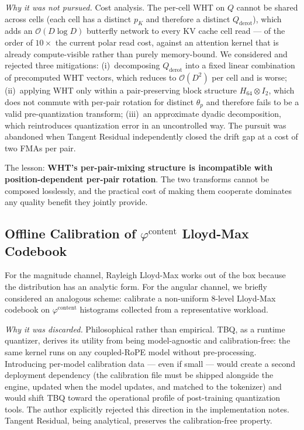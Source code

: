 \documentclass[10pt,twocolumn]{article}
\begin{document}
\emph{Why it was not pursued.} Cost analysis. The per-cell WHT on $Q$ cannot be shared across cells (each cell has a distinct $p_K$ and therefore a distinct $Q_{\text{derot}}$), which adds an $\mathcal{O}(D\log D)$ butterfly network to every KV cache cell read --- of the order of $10\times$ the current polar read cost, against an attention kernel that is already compute-visible rather than purely memory-bound. We considered and rejected three mitigations: (i)~decomposing $Q_{\text{derot}}$ into a fixed linear combination of precomputed WHT vectors, which reduces to $\mathcal{O}(D^2)$ per cell and is worse; (ii)~applying WHT only within a pair-preserving block structure $H_{64}\otimes I_2$, which does not commute with per-pair rotation for distinct $\theta_p$ and therefore fails to be a valid pre-quantization transform; (iii)~an approximate dyadic decomposition, which reintroduces quantization error in an uncontrolled way. The pursuit was abandoned when Tangent Residual independently closed the drift gap at a cost of two FMAs per pair.

The lesson: \textbf{WHT's per-pair-mixing structure is incompatible with position-dependent per-pair rotation}. The two transforms cannot be composed losslessly, and the practical cost of making them cooperate dominates any quality benefit they jointly provide.

\subsection{Offline Calibration of $\varphi^{\text{content}}$ Lloyd-Max Codebook}

For the magnitude channel, Rayleigh Lloyd-Max works out of the box because the distribution has an analytic form. For the angular channel, we briefly considered an analogous scheme: calibrate a non-uniform 8-level Lloyd-Max codebook on $\varphi^{\text{content}}$ histograms collected from a representative workload.

\emph{Why it was discarded.} Philosophical rather than empirical. TBQ, as a runtime quantizer, derives its utility from being model-agnostic and calibration-free: the same kernel runs on any coupled-RoPE model without pre-processing. Introducing per-model calibration data --- even if small --- would create a second deployment dependency (the calibration file must be shipped alongside the engine, updated when the model updates, and matched to the tokenizer) and would shift TBQ toward the operational profile of post-training quantization tools. The author explicitly rejected this direction in the implementation notes. Tangent Residual, being analytical, preserves the calibration-free property.
\end{document}
